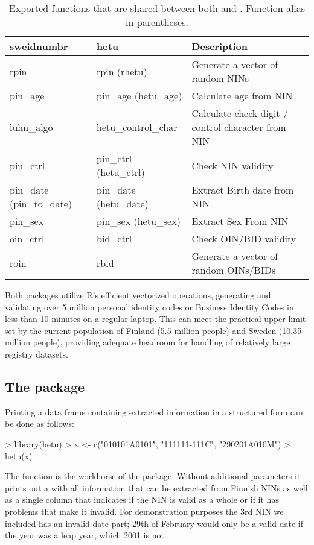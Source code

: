 \begin{table}[ht]
\centering
\begin{tabular}{lll}
\toprule
    sweidnumbr & hetu & Description \\
  \hline
  rpin & rpin (rhetu) & Generate a vector of random NINs \\
  pin\_age & pin\_age (hetu\_age) & Calculate age from NIN \\
  luhn\_algo & hetu\_control\_char & Calculate check digit / control character from NIN \\
  pin\_ctrl & pin\_ctrl (hetu\_ctrl) & Check NIN validity \\
  pin\_date (pin\_to\_date) & pin\_date (hetu\_date) & Extract Birth date from NIN \\
  pin\_sex & pin\_sex (hetu\_sex) & Extract Sex From NIN \\
  oin\_ctrl & bid\_ctrl & Check OIN/BID validity \\
  roin & rbid & Generate a vector of random OINs/BIDs \\
  
\bottomrule
\end{tabular}
\caption{Exported functions that are shared between both  and . Function alias in parentheses.}
\label{tab:hetu_sweidnumbr_shared_functions}
\end{table}

Both packages utilize R’s efficient vectorized operations, generating and validating over 5 million personal identity codes or Business Identity Codes in less than 10 minutes on a regular laptop. This can meet the practical upper limit set by the current population of Finland (5.5 million people) and Sweden (10.35 million people), providing adequate headroom for handling of relatively large registry datasets.

\subsection{The  package}

Printing a data frame containing extracted information in a structured form can be done as follows:

\begin{example}
 > library(hetu)
 > x <- c("010101A0101", "111111-111C", "290201A010M")
 > hetu(x)
\end{example}

The  function is the workhorse of the  package. Without additional parameters it prints out a  with all information that can be extracted from Finnish NINs as well as a single column that indicates if the NIN is valid as a whole or if it has problems that make it invalid. For demonstration purposes the 3rd NIN we included has an invalid date part; 29th of February would only be a valid date if the year was a leap year, which 2001 is not.

